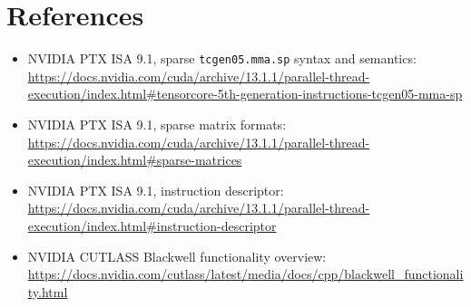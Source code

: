 \documentclass[11pt]{article}
\begin{document}
\section{References}

\begin{itemize}
\item NVIDIA PTX ISA 9.1, sparse \texttt{tcgen05.mma.sp} syntax and semantics:
\url{https://docs.nvidia.com/cuda/archive/13.1.1/parallel-thread-execution/index.html#tensorcore-5th-generation-instructions-tcgen05-mma-sp}
\item NVIDIA PTX ISA 9.1, sparse matrix formats:
\url{https://docs.nvidia.com/cuda/archive/13.1.1/parallel-thread-execution/index.html#sparse-matrices}
\item NVIDIA PTX ISA 9.1, instruction descriptor:
\url{https://docs.nvidia.com/cuda/archive/13.1.1/parallel-thread-execution/index.html#instruction-descriptor}
\item NVIDIA CUTLASS Blackwell functionality overview:
\url{https://docs.nvidia.com/cutlass/latest/media/docs/cpp/blackwell_functionality.html}
\end{itemize}
\end{document}
